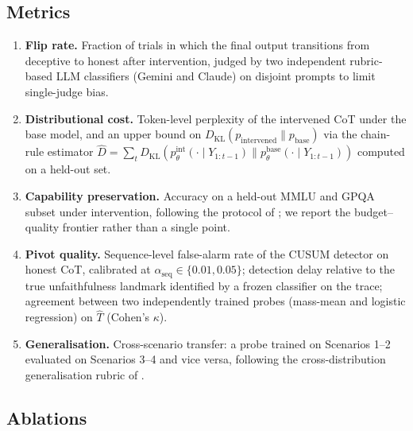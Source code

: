 \documentclass[11pt]{article}
\theoremstyle{definition}
\newcommand{\1}{\mathbf{1}}
\newcommand{\KL}{D_{\mathrm{KL}}}
\begin{document}
\subsection{Metrics}

\begin{enumerate}[leftmargin=1.4em,itemsep=0.15em]
\item \textbf{Flip rate.} Fraction of trials in which the final output transitions from deceptive to honest after intervention, judged by two independent rubric-based LLM classifiers (Gemini and Claude) on disjoint prompts to limit single-judge bias.
\item \textbf{Distributional cost.} Token-level perplexity of the intervened CoT under the base model, and an upper bound on $\KL(p_{\mathrm{intervened}} \| p_{\mathrm{base}})$ via the chain-rule estimator $\widehat{D} = \sum_t \KL(p_{\theta}^{\mathrm{int}}(\cdot \mid Y_{1:t-1}) \| p_{\theta}^{\mathrm{base}}(\cdot \mid Y_{1:t-1}))$ computed on a held-out set.
\item \textbf{Capability preservation.} Accuracy on a held-out MMLU and GPQA subset under intervention, following the protocol of \citet{pres2024reliable}; we report the budget--quality frontier rather than a single point.
\item \textbf{Pivot quality.} Sequence-level false-alarm rate of the CUSUM detector on honest CoT, calibrated at $\alpha_{\mathrm{seq}} \in \{0.01, 0.05\}$; detection delay relative to the true unfaithfulness landmark identified by a frozen classifier on the trace; agreement between two independently trained probes (mass-mean and logistic regression) on $\widehat{T}$ (Cohen's $\kappa$).
\item \textbf{Generalisation.} Cross-scenario transfer: a probe trained on Scenarios 1--2 evaluated on Scenarios 3--4 and vice versa, following the cross-distribution generalisation rubric of \citet{goldowsky2025deception}.
\end{enumerate}

\subsection{Ablations}
\end{document}
